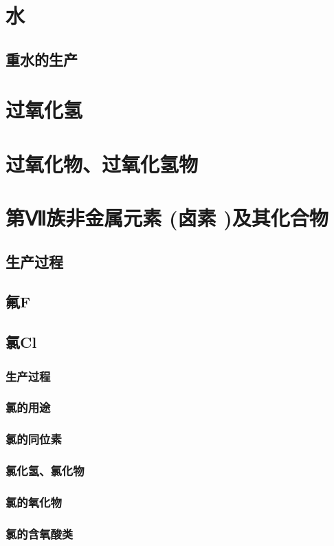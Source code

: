 \documentclass[UTF8]{../03-Chemistry}
\begin{document}
\section{水}
    \subsection{重水的生产}
\section{过氧化氢}
\section{过氧化物、过氧化氢物}



\section{第Ⅶ族非金属元素 (卤素 )及其化合物}
    \subsection{生产过程}
    \subsection{氟F}
    \subsection{氯Cl}
        \subsubsection{生产过程}
        \subsubsection{氯的用途}
        \subsubsection{氯的同位素}
        \subsubsection{氯化氢、氯化物}
        \subsubsection{氯的氧化物}
        \subsubsection{氯的含氧酸类}
\end{document}
